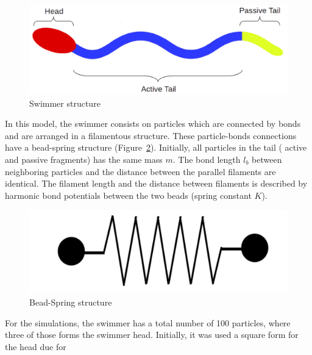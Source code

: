 \begin{figure}[ht]
  \centering
  \begin{footnotesize}
  \includegraphics[scale=0.25]{images/swimmer-struc.png}
  \caption[Swimmer Structure]{Swimmer structure}
  \label{fig:Bild1}
  \end{footnotesize}
\end{figure} 


In this model, the swimmer consists on particles which are connected by bonds and are arranged in a filamentous structure. These particle-bonds connections have a bead-spring 
structure (Figure~\ref{fig:Bild2}). Initially, all particles in the tail ( active and passive fragments) has the same mass $m$. The bond length $l_{b}$ between neighboring
particles and the distance between the parallel filaments are identical. The filament length and the distance between filaments is described by harmonic bond potentials between
the two beads (spring constant $K$).

\begin{figure}[ht]
  \centering
  \begin{footnotesize}
  \includegraphics[scale=0.25]{images/bead-spring.png}
  \caption[Bead-Spring structure]{Bead-Spring structure}
  \label{fig:Bild2}
  \end{footnotesize}
\end{figure} 

For the simulations, the swimmer has a total number of 100 particles, where three of those forms the swimmer head. Initially, it was used a square form for the head due for 